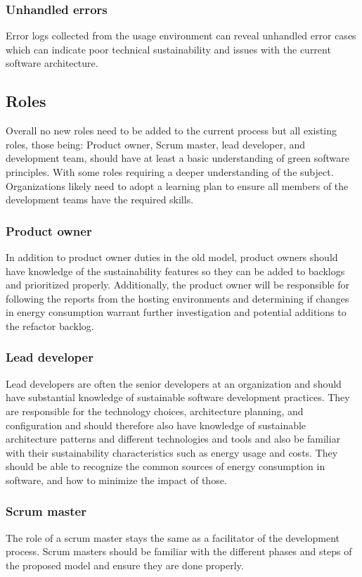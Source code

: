 \subsubsection{Unhandled errors}
Error logs collected from the usage environment can reveal unhandled error cases which can indicate poor technical sustainability and issues with the current software architecture.

\subsection{Roles}
Overall no new roles need to be added to the current process but all existing roles, those being: Product owner, Scrum master, lead developer, and development team, should have at least a basic understanding of green software principles. With some roles requiring a deeper understanding of the subject. Organizations likely need to adopt a learning plan to ensure all members of the development teams have the required skills.

\subsubsection{Product owner}
In addition to product owner duties in the old model, product owners should have knowledge of the sustainability features so they can be added to backlogs and prioritized properly. Additionally, the product owner will be responsible for following the reports from the hosting environments and determining if changes in energy consumption warrant further investigation and potential additions to the refactor backlog.

\subsubsection{Lead developer}
Lead developers are often the senior developers at an organization and should have substantial knowledge of sustainable software development practices. They are responsible for the technology choices, architecture planning, and configuration and should therefore also have knowledge of sustainable architecture patterns and different technologies and tools and also be familiar with their sustainability characteristics such as energy usage and costs. They should be able to recognize the common sources of energy consumption in software, and how to minimize the impact of those.

\subsubsection{Scrum master}
The role of a scrum master stays the same as a facilitator of the development process. Scrum masters should be familiar with the different phases and steps of the proposed model and ensure they are done properly.

